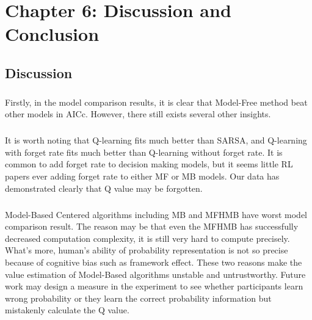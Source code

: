 
\chapter{Chapter 6: Discussion and Conclusion} %

\label{Chapter 6} %

\section{Discussion}
\paragraph{}
Firstly, in the model comparison results, it is clear that Model-Free method beat other models in AICc. However, there still exists several other insights. 
\paragraph{}
It is worth noting that Q-learning fits much better than SARSA, and Q-learning with forget rate fits much better than Q-learning without forget rate. It is common to add forget rate to decision making models, but it seems little RL papers ever adding forget rate to either MF or MB models. Our data has demonstrated clearly that Q value may be forgotten. 
\paragraph{}
Model-Based Centered algorithms including MB and MFHMB have worst model comparison result. The reason may be that even the MFHMB has successfully decreased computation complexity, it is still very hard to compute precisely. What's more, human's ability of probability representation is not so precise because of cognitive bias such as framework effect. These two reasons make the value estimation of Model-Based algorithms unstable and untrustworthy. Future work may design a measure in the experiment to see whether participants learn wrong probability or they learn the correct probability information but mistakenly calculate the Q value. 
